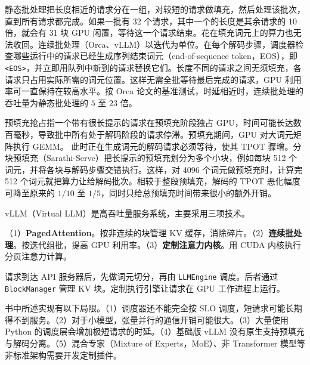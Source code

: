 \begin{interview}
静态批处理把长度相近的请求分在一组，对较短的请求做填充，然后处理该批次，直到所有请求都完成。如果一批有 32 个请求，其中一个的长度是其余请求的 10 倍，就会有 31 块 GPU 闲置，等待这一个请求结束。花在填充词元上的算力也无法收回。连续批处理（Orca、vLLM）以迭代为单位。在每个解码步骤，调度器检查哪些运行中的请求已经生成序列结束词元（end-of-sequence token，EOS），即 \texttt{<EOS>}，并立即用队列中新到的请求替换它们。长度不同的请求之间无须填充，各请求只占用实际所需的词元位置。这样无需全批等待最后完成的请求，GPU 利用率可一直保持在较高水平。按 Orca 论文的基准测试，时延相近时，连续批处理的吞吐量为静态批处理的 \(5\) 至 \(23\) 倍。


预填充抢占指一个带有很长提示的请求在预填充阶段独占 GPU，时间可能长达数百毫秒，导致批中所有处于解码阶段的请求停滞。预填充期间，GPU 对大词元矩阵执行 GEMM。
此时正在生成词元的解码请求必须等待，使其 TPOT 骤增。分块预填充（Sarathi-Serve）把长提示的预填充划分为多个小块，例如每块 512 个词元，并将各块与解码步骤交错执行。这样，对 4096 个词元做预填充时，计算完 512 个词元就把算力让给解码批次。相较于整段预填充，解码的 TPOT 恶化幅度可降至原来的 \(1/10\) 至 \(1/5\)，同时只给总预填充时间带来很小的额外开销。

vLLM（Virtual LLM）是高吞吐量服务系统，主要采用三项技术。

（1）\textbf{PagedAttention}。按非连续的块管理 KV 缓存，消除碎片。（2）\textbf{连续批处理}。按迭代组批，提高 GPU 利用率。（3）\textbf{定制注意力内核}。用 CUDA 内核执行分页注意力计算。

请求到达 API 服务器后，先做词元切分，再由 \texttt{LLMEngine} 调度。后者通过 \texttt{BlockManager} 管理 KV 块。定制执行引擎让请求在 GPU 工作进程上运行。

书中所述实现有以下局限。（1）调度器还不能完全按 SLO 调度，短请求可能长期得不到服务。（2）对于小模型，张量并行的通信开销可能很大。（3）大量使用 Python 的调度层会增加极短请求的时延。（4）基础版 vLLM 没有原生支持预填充与解码分离。（5）混合专家（Mixture of Experts，MoE）、非 Transformer 模型等非标准架构需要开发定制插件。



\end{interview}
